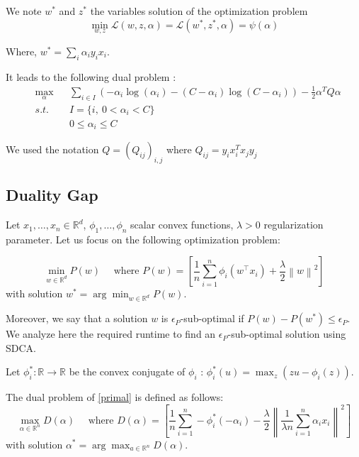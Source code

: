\documentclass{article}
\newcommand{\norm}[1]{\left\|#1 \right\|}
\begin{document}
We note $w^*$ and $z^*$ the variables solution of the optimization problem
\begin{equation}
	\min_{w, z} \mathcal{L}(w, z, \alpha) = \mathcal{L}(w^*, z^*, \alpha) = \psi(\alpha) 
\end{equation}

Where, $w^* = \sum_i \alpha_i y_i x_i$.

It leads to the following dual problem :
\begin{equation}
	\begin{aligned}
		& \max_{\alpha} & &\sum_{i \in I} (-\alpha_i \log(\alpha_i) - (C-\alpha_i) \log(C - \alpha_i)) - \frac{1}{2} \alpha^TQ\alpha\\
		& s.t.          & &I = \{i,\ 0 < \alpha_i < C \}\\
		&               & &0 \leq \alpha_i \leq C
	\end{aligned}
\end{equation}

We used the notation $Q = (Q_{ij})_{i,j}$ where $Q_{ij} = y_i x_i^T x_j y_j$


\subsection{Duality Gap}

Let $x_1, \dots, x_n \in \mathbb{R}^d$, $\phi_1, \dots, \phi_n$ scalar convex functions, $\lambda > 0$ regularization parameter.
Let us focus on the following optimization problem:

\begin{equation}
    \min_{w \in \mathbb{R}^d} P(w) \quad \text{ where } P(w) = \left[ \dfrac{1}{n} \sum_{i=1}^n \phi_i(w^\top x_i) + \dfrac{\lambda}{2}\norm{w}^2 \right]
    \label{primal}
\end{equation}
with solution $w^{*} = \arg \min_{w \in \mathbb{R}^d} P(w)$.

Moreover, we say that a solution $w$ is $\epsilon_P$-sub-optimal if $P(w) - P(w^{*}) \leq \epsilon_P$.
We analyze here the required runtime to find an $\epsilon_P$-sub-optimal solution using SDCA.

Let $\phi_i^{*} : \mathbb{R} \rightarrow \mathbb{R}$ be the convex conjugate of $\phi_i$ : $\phi_i^{*}(u) = \max_z (zu-\phi_i(z))$.

The dual problem of \eqref{primal} is defined as follows:
\begin{equation}
    \max_{\alpha \in \mathbb{R}^n} D(\alpha) \quad \text{ where } D(\alpha) = \left[ \dfrac{1}{n} \sum_{i=1}^n -\phi_i^{*}(-\alpha_i) - \dfrac{\lambda}{2}\norm{\dfrac{1}{\lambda n}\sum_{i=1}^n \alpha_ix_i}^2 \right]
    \label{dual}
\end{equation}
with solution $\alpha^{*} = \arg \max_{a \in \mathbb{R}^n} D(\alpha)$.
\end{document}
